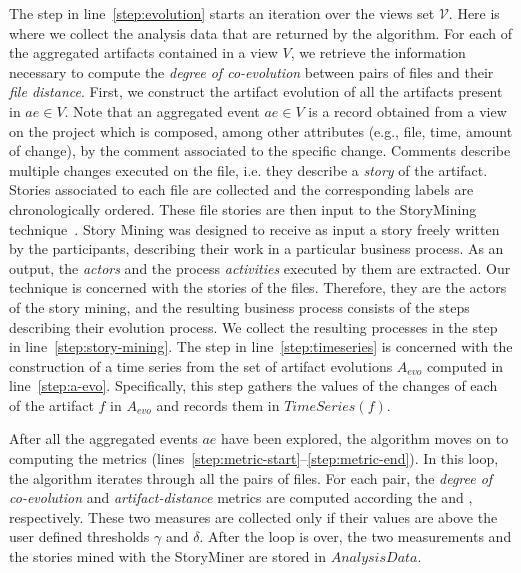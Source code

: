 

%

%

The step in line~\ref{step:evolution} starts an iteration over the views set $\mathcal{V}$. Here is where we collect the analysis data that are returned by the algorithm. For each of the aggregated artifacts contained in a view $V$, we retrieve the information necessary to compute the \emph{degree of co-evolution} between pairs of files and their \emph{file distance}. First, we construct the artifact evolution of all the artifacts present in $ae \in V$. 
Note that an aggregated event $ae \in V$ is a record obtained from a view on the project which is composed, among other attributes (e.g., file, time, amount of change), by the comment associated to the specific change. Comments describe multiple changes executed on the file, i.e. they describe a \emph{story} of the artifact. 
Stories associated to each file are collected and the corresponding labels are chronologically ordered. These file stories are then input to the StoryMining technique~\cite{Goncalves2011}. Story Mining was designed to receive as input a story freely written by the participants, describing their work in a particular business process. As an output, the \emph{actors} and the process \emph{activities} executed by them are extracted. Our technique is concerned with the stories of the files. Therefore, they are the actors of the story mining, and the resulting business process consists of the steps describing their evolution process. We collect the resulting processes in the step in line~\ref{step:story-mining}.
The step in line~\ref{step:timeseries} is concerned with the construction of a time series from the set of artifact evolutions $A_{evo}$ computed in line~\ref{step:a-evo}. Specifically, this step gathers the values of the changes of each of the artifact $f$ in $A_{evo}$ and records them in $TimeSeries(f)$. 

After all the aggregated events $ae$ have been explored, the algorithm moves on to computing the metrics (lines~\ref{step:metric-start}--\ref{step:metric-end}). In this loop, the algorithm iterates through all the pairs of files. For each pair, the \emph{degree of co-evolution} and \emph{artifact-distance}  metrics are computed according the  and , respectively. These two measures are collected only if their values are above the user defined thresholds $\gamma$ and $\delta$. After the loop is over, the two measurements and the stories mined with the StoryMiner are stored in $AnalysisData$.

